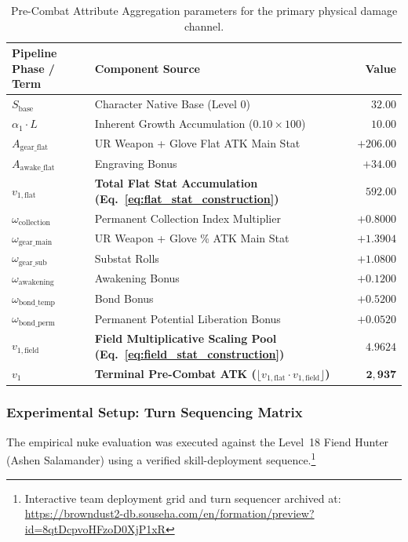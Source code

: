 \documentclass[twocolumn,10pt]{article}
\begin{document}
\begin{table}[H]
\centering
\small
\begin{tabular}{llr}
\toprule
\textbf{Pipeline Phase / Term} & \textbf{Component Source} & \textbf{Value} \\
\midrule
$S_{\text{base}}$ & Character Native Base (Level 0) & $32.00$ \\
$\alpha_1 \cdot L$ & Inherent Growth Accumulation ($0.10 \times 100$) & $10.00$ \\
$A_{\text{gear\_flat}}$ & UR Weapon + Glove Flat ATK Main Stat & $+206.00$ \\
$A_{\text{awake\_flat}}$ & Engraving Bonus & $+34.00$ \\
\midrule
\textbf{$v_{1,\text{flat}}$} & \textbf{Total Flat Stat Accumulation (Eq.~\ref{eq:flat_stat_construction})} & $\mathbf{592.00}$ \\
\midrule
$\omega_{\text{collection}}$ & Permanent Collection Index Multiplier & $+0.8000$ \\
$\omega_{\text{gear\_main}}$ & UR Weapon + Glove \% ATK Main Stat & $+1.3904$ \\
$\omega_{\text{gear\_sub}}$ & Substat Rolls & $+1.0800$ \\
$\omega_{\text{awakening}}$ & Awakening Bonus & $+0.1200$ \\
$\omega_{\text{bond\_temp}}$ & Bond Bonus& $+0.5200$ \\
$\omega_{\text{bond\_perm}}$ & Permanent Potential Liberation Bonus& $+0.0520$ \\
\midrule
\textbf{$v_{1,\text{field}}$} & \textbf{Field Multiplicative Scaling Pool (Eq.~\ref{eq:field_stat_construction})} & $\mathbf{4.9624}$ \\
\midrule
\textbf{$v_1$} & \textbf{Terminal Pre-Combat ATK ($\lfloor v_{1,\text{flat}} \cdot v_{1,\text{field}} \rfloor$)} & $\mathbf{2,937}$ \\
\bottomrule
\end{tabular}
\caption{Pre-Combat Attribute Aggregation parameters for the primary physical damage channel.}
\label{tab:prefight_stats}
\end{table}

\subsubsection{Experimental Setup: Turn Sequencing Matrix}
The empirical nuke evaluation was executed against the Level~18 Fiend Hunter (Ashen Salamander) using a verified skill-deployment sequence.\footnote{Interactive team deployment grid and turn sequencer archived at: \url{https://browndust2-db.souseha.com/en/formation/preview?id=8qtDcpvoHFzoD0XjP1xR}}
\end{document}
